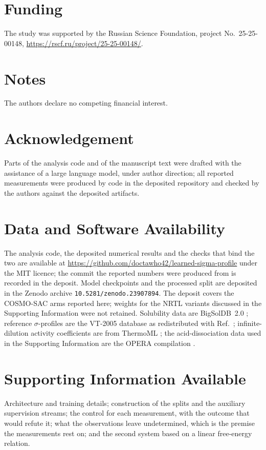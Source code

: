 \documentclass[journal=jcisd8,manuscript=article,layout=twocolumn]{achemso}
\begin{document}
\section*{Funding}
\noindent The study was supported by the Russian Science Foundation, project No.~25-25-00148,
\url{https://rscf.ru/project/25-25-00148/}.

\section*{Notes}
\noindent The authors declare no competing financial interest.

\section*{Acknowledgement}
\noindent Parts of the analysis code and of the manuscript text were drafted with the assistance of
a large language model, under author direction; all reported measurements were produced by code in
the deposited repository and checked by the authors against the deposited artifacts.

\section*{Data and Software Availability}
The analysis code, the deposited numerical results and the checks that bind the two are
available at \url{https://github.com/doctawho42/learned-sigma-profile} under the MIT licence;
the commit the reported numbers were produced from is recorded in the deposit. Model
checkpoints and the processed split are deposited in the Zenodo archive
\texttt{10.5281/zenodo.23907894}. The deposit covers the COSMO-SAC arms reported here; weights for
the NRTL variants discussed in the Supporting Information were not retained. Solubility data are
BigSolDB~2.0 \cite{krasnov2025bigsoldb}; reference $\sigma$-profiles are the VT-2005 database
\cite{mullins2006} as redistributed with Ref.~\cite{bell2020cosmosac}; infinite-dilution activity
coefficients are from ThermoML \cite{frenkel2011thermoml}; the acid-dissociation data used in the
Supporting Information are the OPERA compilation \cite{mansouri2019opera}.

\section*{Supporting Information Available}
Architecture and training details; construction of the splits and the auxiliary supervision
streams; the control for each measurement, with the outcome that would refute it; what the observations leave
undetermined, which is the premise the measurements rest on; and the second system based on a linear
free-energy relation.


\end{document}

